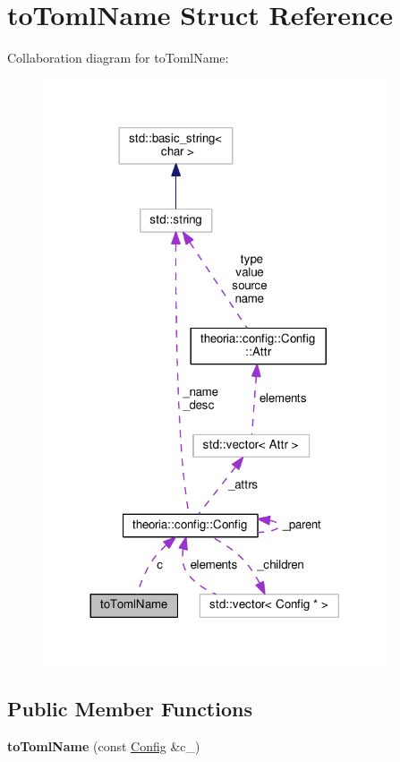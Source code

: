 \hypertarget{structtoTomlName}{\section{to\+Toml\+Name Struct Reference}
\label{structtoTomlName}
}


Collaboration diagram for to\+Toml\+Name\+:
\nopagebreak
\begin{figure}[H]
\begin{center}
\leavevmode
\includegraphics[width=288pt]{structtoTomlName__coll__graph}
\end{center}
\end{figure}
\subsection*{Public Member Functions}
\begin{DoxyCompactItemize}
\item 
\hypertarget{structtoTomlName_af8c07f9b89f61b4c54e942c0bfe3e544}{{\bfseries to\+Toml\+Name} (const \hyperlink{classtheoria_1_1config_1_1Config}{Config} \&c\+\_\+)}\label{structtoTomlName_af8c07f9b89f61b4c54e942c0bfe3e544}

\end{DoxyCompactItemize}
